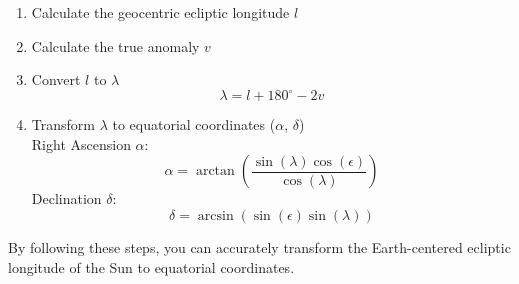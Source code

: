\documentclass[12pt,a4paper]{article}
\begin{document}
	\begin{enumerate}
		\item Calculate the geocentric ecliptic longitude \(l\)
		\item Calculate the true anomaly \(v\)
		\item Convert \(l\) to \(\lambda\) \\
			\[
				\lambda = l + 180^\circ - 2v
			\]
		\item Transform \(\lambda\) to equatorial coordinates (\(\alpha\), \(\delta\)) \\
			Right Ascension \(\alpha\):
			\[
			\alpha = \arctan \left( \frac{\sin(\lambda) \cos(\epsilon)}{\cos(\lambda)} \right)
			\]
			Declination \(\delta\):
			\[
			\delta = \arcsin (\sin(\epsilon) \sin(\lambda))
			\]
	\end{enumerate}
	
	
	By following these steps, you can accurately transform the Earth-centered ecliptic longitude of the Sun to equatorial coordinates.
\end{document}
